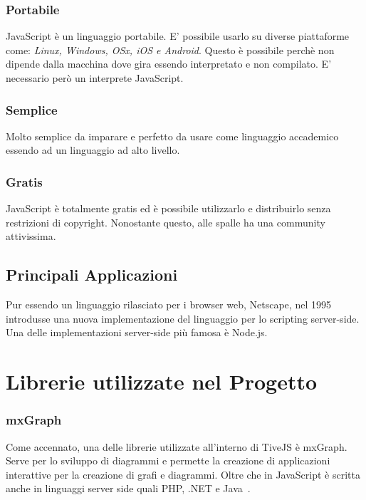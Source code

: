             \subsubsection{Portabile}
                JavaScript è un linguaggio portabile. E' possibile usarlo su diverse piattaforme come: \textit{Linux, Windows, OSx, iOS e Android}. Questo è possibile perchè non dipende dalla macchina dove gira essendo interpretato e non compilato. E' necessario però un interprete JavaScript.

            \subsubsection{Semplice}
                Molto semplice da imparare e perfetto da usare come linguaggio accademico essendo ad un linguaggio ad alto livello.

            \subsubsection{Gratis}
                JavaScript è totalmente gratis ed è possibile utilizzarlo e distribuirlo senza restrizioni di copyright. Nonostante questo, alle spalle ha una community attivissima.

        \subsection{Principali Applicazioni}
            Pur essendo un linguaggio rilasciato per i browser web, Netscape, nel 1995 introdusse una nuova implementazione del linguaggio per lo scripting server-side. Una delle implementazioni server-side più famosa è Node.js.

        \section{Librerie utilizzate nel Progetto}
            \subsubsection{mxGraph}
                Come accennato, una delle librerie utilizzate all'interno di TiveJS è mxGraph. Serve per lo sviluppo di diagrammi e permette la creazione di applicazioni interattive per la creazione di grafi e diagrammi. Oltre che in JavaScript è scritta anche in linguaggi server side quali PHP, .NET e Java~\cite{mxgraph}.
